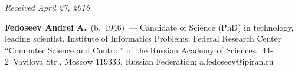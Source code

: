 \vspace*{-3pt}

\hfill{\small\textit{Received April 27, 2016}}
  
  \Contrl
  
 \noindent
  \textbf{Fedoseev Andrei A.}\ (b.\ 1946)~--- Candidate of Science (PhD) in
technology, leading scientist,  Institute of Informatics Problems, Federal Research 
Center ``Computer Science and Control'' of the Russian Academy of  
Sciences,~44-2~Vavilova Str., Moscow 119333, Russian Federation; 
\mbox{a.fedoseev@ipiran.ru}

  
\label{end\stat}


\renewcommand{\bibname}{\protect\rm Литература}